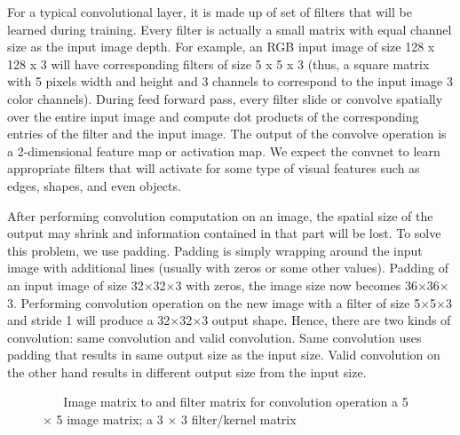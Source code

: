 \documentclass[master]{thesis-uestc}
\begin{document}
For a typical convolutional layer, it is made up of set of filters that will be learned during training. Every filter is actually a small matrix with equal channel size as the input image depth. For example, an RGB input image of size 128 x 128 x 3 will have corresponding filters of size 5 x 5 x 3 (thus, a square matrix with 5 pixels width and height and 3 channels to correspond to the input image 3 color channels). During feed forward pass, every filter slide or convolve spatially over the entire input image and compute dot products of the corresponding entries of the filter and the input image. The output of the convolve operation is a 2-dimensional feature map or activation map. We expect the convnet to learn appropriate filters that will activate for some type of visual features such as edges, shapes, and even objects.   

After performing convolution computation on an image, the spatial size of the output may shrink and information contained in that part will be lost. To solve this problem, we use padding. Padding is simply wrapping around the input image with additional lines (usually with zeros or some other values). Padding of an input image of size 32$\times$32$\times$3 with zeros, the image size now becomes 36$\times$36$\times$3. Performing convolution operation on the new image with a filter of size 5$\times$5$\times$3 and stride 1 will produce a 32$\times$32$\times$3 output shape. Hence, there are two kinds of convolution: same convolution and valid convolution. Same convolution uses padding that results in same output size as the input size. Valid convolution on the other hand results in different output size from the input size.
\begin{figure}%
\centering
{}%
\hspace{8pt}%
\caption{\,\,\,\,\,\,\,\,\,\,Image matrix to and filter matrix for convolution operation
 a 5 $\times$ 5 image matrix;
 a 3 $\times$ 3 filter/kernel matrix}
\label{fig:convolution}
\end{figure}
\end{document}
